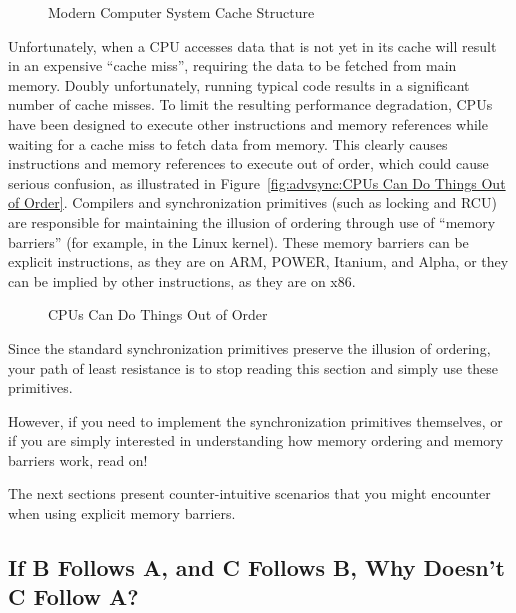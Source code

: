 \begin{figure}[htb]
\centering
{}
\caption{Modern Computer System Cache Structure}
\label{fig:advsync:Modern Computer System Cache Structure}
\end{figure}

Unfortunately, when a CPU accesses data that is not yet in its cache
will result in an expensive ``cache miss'', requiring the data to
be fetched from main memory.
Doubly unfortunately, running typical code results in a significant
number of cache misses.
To limit the resulting performance degradation, CPUs have been designed to
execute other instructions and memory references while waiting for
a cache miss to fetch data from memory.
This clearly causes instructions and memory references to execute out
of order, which could cause serious confusion, as illustrated in
Figure~\ref{fig:advsync:CPUs Can Do Things Out of Order}.
Compilers and synchronization primitives (such as locking and RCU)
are responsible for maintaining the illusion of ordering through use of
``memory barriers'' (for example,  in the Linux kernel).
These memory barriers can be explicit instructions, as they are on
ARM, POWER, Itanium, and Alpha, or they can be implied by other instructions,
as they are on x86.

\begin{figure}[htb]
\centering
{}
\caption{CPUs Can Do Things Out of Order}
\end{figure}

Since the standard synchronization primitives preserve the illusion of
ordering, your path of least resistance is to stop reading
this section and simply use these primitives.

However, if you need to implement the synchronization primitives
themselves, or if you are simply interested in understanding how memory
ordering and memory barriers work, read on!

The next sections present counter-intuitive scenarios that you might
encounter when using explicit memory barriers.

\subsection{If B Follows A, and C Follows B, Why Doesn't C Follow A?}
\label{sec:advsync:If B Follows A, and C Follows B, Why Doesn't C Follow A?}

